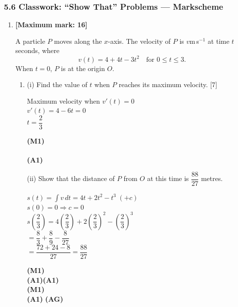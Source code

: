 \documentclass[12pt, twoside]{article}
\begin{document}
\subsubsection*{5.6 Classwork: ``Show That'' Problems --- Markscheme}

\begin{enumerate}[itemsep=0.2cm]

\item \textbf{[Maximum mark: 16]}

A particle $P$ moves along the $x$-axis. The velocity of $P$ is $v$\;m\,s$^{-1}$
at time $t$ seconds, where
\[v(t) = 4 + 4t - 3t^2 \quad \text{for } 0 \leq t \leq 3.\]
When $t = 0$, $P$ is at the origin $O$.

\begin{enumerate}[itemsep=0.3cm]
  \item (i) \; Find the value of $t$ when $P$ reaches its maximum velocity. \hfill [7]

  \begin{minipage}[t]{0.62\textwidth}
  Maximum velocity when $v'(t) = 0$\\[0.15cm]
  $v'(t) = 4 - 6t = 0$\\[0.15cm]
  $t = \dfrac{2}{3}$
  \end{minipage}%
  \begin{minipage}[t]{0.35\textwidth}\raggedleft
  \textbf{(M1)}\\[0.15cm]
  ~\\[0.15cm]
  \textbf{(A1)}
  \end{minipage}

  \medskip
  (ii) Show that the distance of $P$ from $O$ at this time is
       $\dfrac{88}{27}$ metres.

  \begin{minipage}[t]{0.62\textwidth}
  $s(t) = \displaystyle\int v\,dt = 4t + 2t^2 - t^3 \; (+c)$\\[0.2cm]
  $s(0) = 0 \Rightarrow c = 0$\\[0.15cm]
  $s\!\left(\dfrac{2}{3}\right) = 4\!\left(\dfrac{2}{3}\right)
    + 2\!\left(\dfrac{2}{3}\right)^{\!2}
    - \left(\dfrac{2}{3}\right)^{\!3}$\\[0.2cm]
  $= \dfrac{8}{3} + \dfrac{8}{9} - \dfrac{8}{27}$\\[0.2cm]
  $= \dfrac{72 + 24 - 8}{27} = \dfrac{88}{27}$
  \end{minipage}%
  \begin{minipage}[t]{0.35\textwidth}\raggedleft
  \textbf{(M1)}\\[0.2cm]
  \textbf{(A1)(A1)}\\[0.15cm]
  \textbf{(M1)}\\[1.1cm]
  \textbf{(A1)} \textbf{(AG)}
  \end{minipage}


\end{enumerate}
\end{enumerate}
\end{document}
